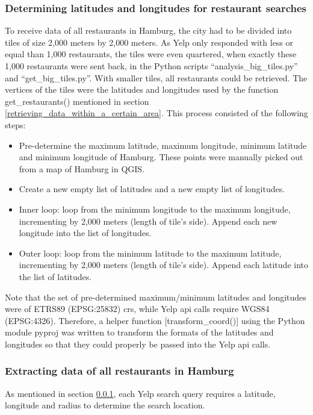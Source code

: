 \documentclass[a4paper, 11pt, oneside]{Thesis}  %
\begin{document}
\subsubsection{Determining latitudes and longitudes for restaurant searches}
\label{Determining_latitudes_and_longitudes_for_restaurant_searches}

To receive data of all restaurants in Hamburg, the city had to be divided into tiles of size 2,000 meters by 2,000 meters. As Yelp only responded with less or equal than 1,000 restaurants, the tiles were even quartered, when exactly these 1,000 restaurants were sent back, in the Python scripts ``analysis\_big\_tiles.py'' and ``get\_big\_tiles.py''. With smaller tiles, all restaurants could be retrieved. The vertices of the tiles were the latitudes and longitudes used by the function get\_restaurants() mentioned in section \ref{retrieving_data_within_a_certain_area}. This process consisted of the following steps:
\begin{itemize}
\item Pre-determine the maximum latitude, maximum longitude, minimum latitude and minimum longitude of Hamburg. These points were manually picked out from a map of Hamburg in QGIS.
\item Create a new empty list of latitudes and a new empty list of longitudes.
\item Inner loop: loop from the minimum longitude to the maximum longitude, incrementing by 2,000 meters (length of tile’s side). Append each new longitude into the list of longitudes.
\item Outer loop: loop from the minimum latitude to the maximum latitude, incrementing by 2,000 meters (length of tile’s side). Append each latitude into the list of latitudes.
\end{itemize}

Note that the set of pre-determined maximum/minimum latitudes and longitudes were of ETRS89 (EPSG:25832) \ac{crs}, while Yelp \ac{api} calls require WGS84 (EPSG:4326). Therefore, a helper function [transform\_coord()] using the Python module pyproj \cite{JeffWhitaker.2018} was written to transform the formats of the latitudes and longitudes so that they could properly be passed into the Yelp \ac{api} calls.

\subsubsection{Extracting data of all restaurants in Hamburg}
\label{Extracting data of all restaurants in Hamburg}
As mentioned in section \ref{Determining_latitudes_and_longitudes_for_restaurant_searches}, each Yelp search query requires a latitude, longitude and radius to determine the search location.
\end{document}

